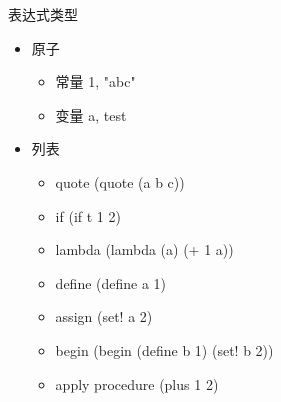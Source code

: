 \documentclass[presentation, bigger]{beamer}
\begin{document}
\begin{frame}[label={sec:org8cf6684}]{表达式类型}
\begin{itemize}
\item 原子
\begin{itemize}
\item 常量 \alert{1}, \alert{"abc"}
\item 变量 \alert{a}, \alert{test}
\end{itemize}
\item 列表
\begin{itemize}
\item quote \alert{(quote (a b c))}
\item if \alert{(if t 1 2)}
\item lambda \alert{(lambda (a) (+ 1 a))}
\item define \alert{(define a 1)}
\item assign \alert{(set! a 2)}
\item begin \alert{(begin (define b 1) (set! b 2))}
\item apply procedure \alert{(plus 1 2)}
\end{itemize}
\end{itemize}
\end{frame}
\end{document}
